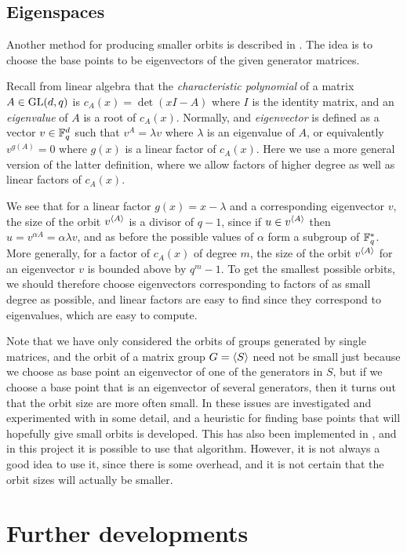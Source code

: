 \subsection{Eigenspaces}
Another method for producing smaller orbits is described in \cite{murray95}. The idea is to choose the base points to be eigenvectors of the given generator matrices.

Recall from linear algebra that the \emph{characteristic polynomial}
of a matrix $A \in \operatorname{GL} (d, q)$ is $c_A(x) = \det (xI - A)$ where $I$
is the identity matrix, and an \emph{eigenvalue} of $A$ is a root of
$c_A(x)$.  Normally, and \emph{eigenvector} is defined as a vector $v
\in \mathbb{F}_q^d$ such that $v^A = \lambda v$ where $\lambda$ is an
eigenvalue of $A$, or equivalently $v^{g(A)} = 0$ where $g(x)$ is a
linear factor of $c_A(x)$. Here we use a more general version of the
latter definition, where we allow factors of higher degree as well as
linear factors of $c_A(x)$.

We see that for a linear factor $g(x) = x - \lambda$ and a
corresponding eigenvector $v$, the size of the orbit $v^{\left\langle A \right\rangle}$ is
a divisor of $q - 1$, since if $u \in v^{\left\langle A \right\rangle}$ then $u = v^{\alpha
  A} = \alpha \lambda v$, and as before the possible values of
$\alpha$ form a subgroup of $\mathbb{F}_q^{*}$. More generally, for a factor
of $c_A(x)$ of degree $m$, the size of the orbit $v^{\left\langle A \right\rangle}$ for an
eigenvector $v$ is bounded above by $q^m - 1$. To get the smallest
possible orbits, we should therefore choose eigenvectors corresponding
to factors of as small degree as possible, and linear factors are easy
to find since they correspond to eigenvalues, which are easy to
compute.

Note that we have only considered the orbits of groups generated by
single matrices, and the orbit of a matrix group $G = \left\langle S \right\rangle$ need
not be small just because we choose as base point an eigenvector of
one of the generators in $S$, but if we choose a base point that is an
eigenvector of several generators, then it turns out that the orbit
size are more often small. In \cite{murray95} these issues are
investigated and experimented with in some detail, and a heuristic for
finding base points that will hopefully give small orbits is
developed. This has also been implemented in \GAP, and in this project
it is possible to use that algorithm. However, it is not always a good
idea to use it, since there is some overhead, and it is not certain
that the orbit sizes will actually be smaller.

\section{Further developments}

